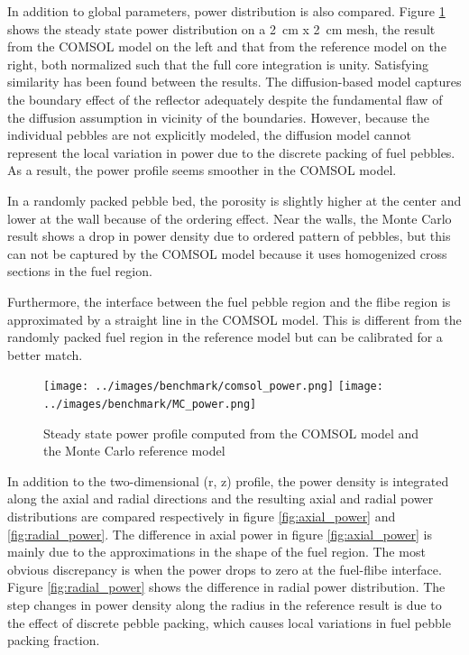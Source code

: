 \documentclass{elsarticle}
\begin{document}
In addition to global parameters, power distribution is also compared. Figure \ref{fig:power_comp} shows the steady state power distribution on a 2~cm x 2~cm mesh, the result from the COMSOL model on the left and that from the reference model on the right, both normalized such that the full core integration is unity. 
Satisfying similarity has been found between the results. The diffusion-based model captures the boundary effect of the reflector adequately despite the fundamental flaw of the diffusion assumption in vicinity of the boundaries. However, because the individual pebbles are not explicitly modeled, the diffusion model cannot represent the local variation in power due to the discrete packing of fuel pebbles. As a result, the power profile seems smoother in the COMSOL model. 

In a randomly packed pebble bed, the porosity is slightly higher at the center and lower at the wall because of the ordering effect. Near the walls, the Monte Carlo result shows a drop in power density due to ordered pattern of pebbles, but this can not be captured by the COMSOL model because it uses homogenized cross sections in the fuel region.

Furthermore, the interface between the fuel pebble region and the flibe region is approximated by a straight line in the COMSOL model. This is different from the randomly packed fuel region in the reference model but can be calibrated for a better match. 


\begin{figure}[ht]
  \centering
  \texttt{[image: ../images/benchmark/comsol\_power.png]}
  \texttt{[image: ../images/benchmark/MC\_power.png]}
  \caption{Steady state power profile computed from the COMSOL model and the Monte Carlo reference model}
  \label{fig:power_comp}
\end{figure}

In addition to the two-dimensional (r, z) profile, the power density is integrated along the axial and radial directions and the resulting axial and radial power distributions are compared respectively in figure \ref{fig:axial_power} and \ref{fig:radial_power}. 
The difference in axial power in figure \ref{fig:axial_power} is mainly due to the approximations in the shape of the fuel region. The most obvious discrepancy is when the power drops to zero at the fuel-flibe interface.
Figure \ref{fig:radial_power} shows the difference in radial power distribution. The step changes in power density along the radius in the reference result is due to the effect of discrete pebble packing, which causes local variations in fuel pebble packing fraction.
\end{document}
